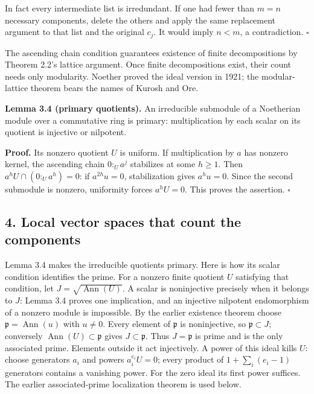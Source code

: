 \documentclass[
]{article}
\begin{document}
In fact every intermediate list is irredundant. If one had fewer than
\(m=n\) necessary components, delete the others and apply the same
replacement argument to that list and the original \(c_j\). It would
imply \(n<m\), a contradiction. \(\square\)

The ascending chain condition guarantees existence of finite
decompositions by Theorem 2.2's lattice argument. Once finite
decompositions exist, their count needs only modularity. Noether proved
the ideal version in 1921; the modular-lattice theorem bears the names
of Kurosh and Ore.

\textbf{Lemma 3.4 (primary quotients).} An irreducible submodule of a
Noetherian module over a commutative ring is primary: multiplication by
each scalar on its quotient is injective or nilpotent.

\textbf{Proof.} Its nonzero quotient \(U\) is uniform. If multiplication
by \(a\) has nonzero kernel, the ascending chain \(0:_U a^j\) stabilizes
at some \(h\ge1\). Then \(a^hU\cap(0:_U a^h)=0\): if \(a^{2h}u=0\),
stabilization gives \(a^hu=0\). Since the second submodule is nonzero,
uniformity forces \(a^hU=0\). This proves the assertion. \(\square\)

\subsection{4. Local vector spaces that count the
components}\label{local-vector-spaces-that-count-the-components}

Lemma 3.4 makes the irreducible quotients primary. Here is how its
scalar condition identifies the prime. For a nonzero finite quotient
\(U\) satisfying that condition, let \(J=\sqrt{\operatorname{Ann}(U)}\).
A scalar is noninjective precisely when it belongs to \(J\): Lemma 3.4
proves one implication, and an injective nilpotent endomorphism of a
nonzero module is impossible. By the earlier existence theorem choose
\(\mathfrak p=\operatorname{Ann}(u)\) with \(u\ne0\). Every element of
\(\mathfrak p\) is noninjective, so \(\mathfrak p\subset J\); conversely
\(\operatorname{Ann}(U)\subset\mathfrak p\) gives
\(J\subset\mathfrak p\). Thus \(J=\mathfrak p\) is prime and is the only
associated prime. Elements outside it act injectively. A power of this
ideal kills \(U\): choose generators \(a_i\) and powers
\(a_i^{e_i}U=0\); every product of \(1+\sum_i(e_i-1)\) generators
contains a vanishing power. For the zero ideal its first power suffices.
The earlier associated-prime localization theorem is used below.
\end{document}
